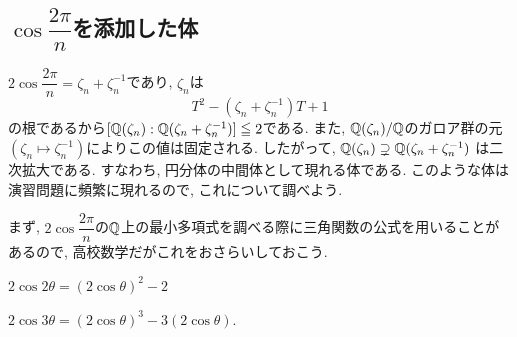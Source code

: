 \subsection{$\cos{\dfrac{2\pi}{n}}$を添加した体}
$2\cos{\dfrac{2\pi}{n}} = \zeta_n + \zeta_n^{-1}$であり, $\zeta_n$は
\[T^2 - (\zeta_n + \zeta_n^{-1})T + 1\]
の根であるから$[\mathbb{Q}(\zeta_n): \mathbb{Q}(\zeta_n + \zeta_n^{-1})]\leqq 2$である. また, $\mathbb{Q}(\zeta_n)/\mathbb{Q}$のガロア群の元$(\zeta_n\mapsto \zeta_{n}^{-1})$によりこの値は固定される.
したがって, $\mathbb{Q}(\zeta_n)\supsetneq \mathbb{Q}(\zeta_n + \zeta_n^{-1})$ は二次拡大である. すなわち, 円分体の中間体として現れる体である. このような体は演習問題に頻繁に現れるので, これについて調べよう. \par
まず, $2\cos{\dfrac{2\pi}{n}}$の$\mathbb{Q}$上の最小多項式を調べる際に三角関数の公式を用いることがあるので, 高校数学だがこれをおさらいしておこう.

\begin{prop}
\ben
\item $2\cos{2\theta} = (2\cos{\theta})^2 - 2$
\item $2\cos{3\theta} = (2\cos{\theta})^{3} - 3(2\cos{\theta})$.
\item
\een
\end{prop}


